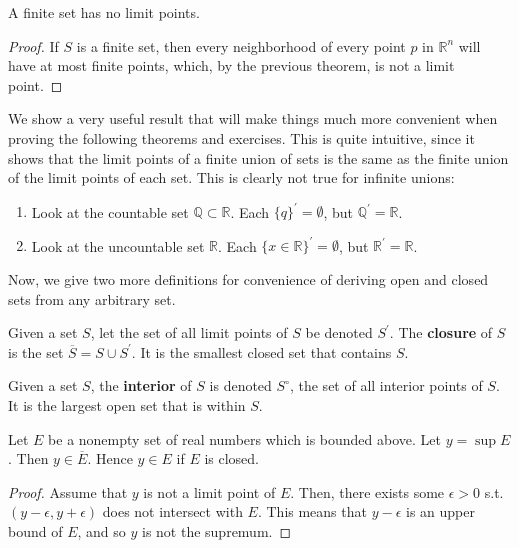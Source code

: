    \begin{corollary}
      A finite set has no limit points. 
    \end{corollary}
    \begin{proof}
      If $S$ is a finite set, then every neighborhood of every point $p$ in $\mathbb{R}^n$ will have at most finite points, which, by the previous theorem, is not a limit point. 
    \end{proof}

    We show a very useful result that will make things much more convenient when proving the following theorems and exercises. This is quite intuitive, since it shows that the limit points of a finite union of sets is the same as the finite union of the limit points of each set. This is clearly not true for infinite unions: 
    \begin{enumerate}
      \item Look at the countable set $\mathbb{Q} \subset \mathbb{R}$. Each $\{q\}^\prime = \emptyset$, but $\mathbb{Q}^\prime = \mathbb{R}$. 
      \item Look at the uncountable set $\mathbb{R}$. Each $\{x \in \mathbb{R}\}^\prime = \emptyset$, but $\mathbb{R}^\prime = \mathbb{R}$. 
    \end{enumerate}

    Now, we give two more definitions for convenience of deriving open and closed sets from any arbitrary set. 

    \begin{definition}[Closure]
      Given a set $S$, let the set of all limit points of $S$ be denoted $S^\prime$. The \textbf{closure} of $S$ is the set $\overline{S} = S \cup S^\prime$. It is the smallest closed set that contains $S$. 
    \end{definition}

    \begin{definition}[Interior]
      Given a set $S$, the \textbf{interior} of $S$ is denoted $S^\circ$, the set of all interior points of $S$. It is the largest open set that is within $S$. 
    \end{definition}

    \begin{theorem}
      Let $E$ be a nonempty set of real numbers which is bounded above. Let $y = \sup{E}$. Then $y \in \overline{E}$. Hence $y \in E$ if $E$ is closed. 
    \end{theorem}
    \begin{proof}
      Assume that $y$ is not a limit point of $E$. Then, there exists some $\epsilon > 0$ s.t. $(y - \epsilon, y + \epsilon)$ does not intersect with $E$. This means that $y - \epsilon$ is an upper bound of $E$, and so $y$ is not the supremum. 
    \end{proof}

